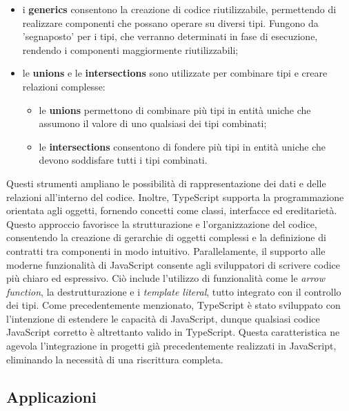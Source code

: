 \begin{itemize}
    \item i \textbf{generics} consentono la creazione di codice riutilizzabile, permettendo di realizzare componenti che possano operare su diversi tipi. Fungono da 'segnaposto' per i tipi, che verranno determinati in fase di esecuzione, rendendo i componenti maggiormente riutilizzabili;\cite{TYPESCRIPT_kinsta}\cite{TYPESCRIPT_freecodecamp}
    \item le \textbf{unions} e le \textbf{intersections} sono utilizzate per combinare tipi e creare relazioni complesse:
    \begin{itemize}
        \item le \textbf{unions} permettono di combinare più tipi in entità uniche che assumono il valore di uno qualsiasi dei tipi combinati;
        \item le \textbf{intersections} consentono di fondere più tipi in entità uniche che devono soddisfare tutti i tipi combinati.\cite{TYPESCRIPT_kinsta}
    \end{itemize}
\end{itemize}
Questi strumenti ampliano le possibilità di rappresentazione dei dati e delle relazioni all'interno del codice.
Inoltre, TypeScript supporta la programmazione orientata agli oggetti, fornendo concetti come classi, interfacce ed ereditarietà. Questo approccio favorisce la strutturazione e l'organizzazione del codice,\cite{TYPESCRIPT_kinsta} consentendo la creazione di gerarchie di oggetti complessi e la definizione di contratti tra componenti in modo intuitivo. Parallelamente, il supporto alle moderne funzionalità di JavaScript consente agli sviluppatori di scrivere codice più chiaro ed espressivo. Ciò include l’utilizzo di funzionalità come le \textit{arrow function}, la destrutturazione e i \textit{template literal}, tutto integrato con il controllo dei tipi. Come precedentemente menzionato, TypeScript è stato sviluppato con l'intenzione di estendere le capacità di JavaScript, dunque qualsiasi codice JavaScript corretto è altrettanto valido in TypeScript. Questa caratteristica ne agevola l'integrazione in progetti già precedentemente realizzati in JavaScript, eliminando la necessità di una riscrittura completa.\cite{TYPESCRIPT_kinsta}\cite{TYPESCRIPT_freecodecamp}

\subsection{Applicazioni}

